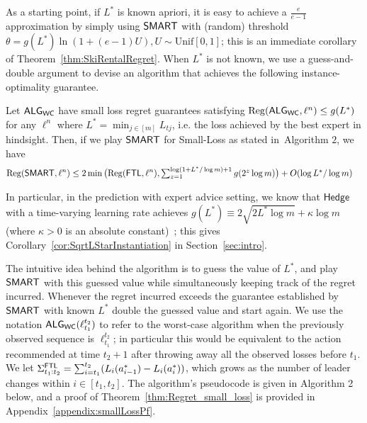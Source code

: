 As a starting point, if $L^*$ is known apriori, it is easy to achieve a $\frac{e}{e-1}$ approximation by simply using $\mathsf{SMART}$ with (random) threshold $\theta = g(L^*)\ln(1+(e-1)U), U \sim \mathrm{Unif}[0,1]$; this is an immediate corollary of Theorem~\ref{thm:SkiRentalRegret}. When $L^*$ is not known, we use a guess-and-double argument to devise an algorithm that achieves the following instance-optimality guarantee. 

\begin{theorem}  
\label{thm:Regret_small_loss}
      Let $\mathsf{ALG}_{\mathsf{WC}}$ have small loss regret guarantees satisfying $\mathrm{Reg}(\mathsf{ALG}_{\mathsf{WC}}, \ell^n) \le g(L^*)$ 
    for any $\ell^n$ where $L^* = \min_{j \in [m]} L_{tj}$, i.e. the loss achieved by the best expert in hindsight. Then, if we play $\mathsf{SMART}$ for Small-Loss as stated in~Algorithm $2$, we have 
    \begin{align*}
    \Reg(\bob, \ell^n) 
    &\leq 2 \min\big(\Reg(\ftl, \ell^n), \textstyle\sum_{z=1}^{\log(1+L^*/\log m) +1} g(2^z \log m)\big) + O(\log L^*/\log m)%
    \end{align*}
\end{theorem}
In particular, in the prediction with expert advice setting, we know that $\mathsf{Hedge}$ with a time-varying learning rate achieves $g(L^*) \equiv 2\sqrt{2 L^* \log m} + \kappa \log m$ (where $\kappa > 0$ is an absolute constant)~\citep{Auer--Cesa-Bianchi--Gentile2002, cesa2007improved}; this gives Corollary~\ref{cor:SqrtLStarInstantiation} in Section~\ref{sec:intro}. 

The intuitive idea behind the algorithm is to guess the value of $L^*$, and play $\mathsf{SMART}$ with this guessed value while simultaneously keeping track of the regret incurred. Whenever the regret incurred exceeds the guarantee established by $\mathsf{SMART}$ with known $L^*$ double the guessed value and start again. We use the notation $\mathsf{ALG}_{\mathsf{WC}}(\ell_{t_1}^{t_2})$ to refer to the worst-case algorithm when the previously observed sequence is $\ell_{t_1}^{t_2}$; in particular this would be equivalent to the action recommended at time $t_2 + 1$ after throwing away all the observed losses before $t_1$. 
We let $\Sigma^{\mathsf{FTL}}_{t_1:t_2} = 
\sum_{i=t_1}^{t_2} (L_i(a^*_{i-1}) - L_i(a^*_i))$, which grows as the number of leader changes within $i \in [t_1, t_2]$. The algorithm's pseudocode is given in Algorithm 2 below, and a proof of Theorem~\ref{thm:Regret_small_loss} is provided in Appendix~\ref{appendix:smallLossPf}. 


